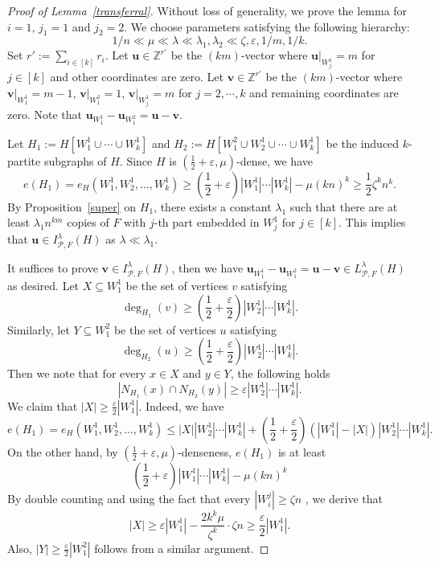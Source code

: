 \documentclass[11pt,a4paper]{article}
\theoremstyle{definition}
\begin{document}
\begin{proof}[Proof of Lemma~\ref{transferral}]
    Without loss of generality, we prove the lemma for $i=1$, $j_1=1$ and $j_2=2$. We choose parameters satisfying the following hierarchy:
    $$1/n\ll \mu \ll \lambda \ll \lambda_1,\lambda_2 \ll \zeta ,\varepsilon, 1/m, 1/k.$$
    Set $r':=\sum _{i\in [k]}r_i$. Let $\mathbf{u}\in \mathbb{Z}^{r'}$ be the $(km)$-vector where $\mathbf{u}|_{W_j^1}=m$ for $j\in [k]$ and other coordinates are zero. Let $\mathbf{v}\in \mathbb{Z}^{r'}$ be the $(km)$-vector where $\mathbf{v}|_{W_1^1}=m-1$, $\mathbf{v}|_{W_1^2}=1$, $\mathbf{v}|_{W_j^1}=m$ for $j=2,\cdots,k$ and remaining coordinates are zero. Note that $\mathbf{u}_{W_1^{1}} -\mathbf{u}_{W_1^{2}}=\mathbf{u}-\mathbf{v}$.
    
Let $H_1:=H[W_1^1\cup \cdots \cup W_k^1]$ and $H_2:=H[W^2_1\cup W_2^1\cup \cdots \cup W_k^1]$ be the induced $k$-partite subgraphs of $H$. Since $H$ is $(\frac{1}{2}+\varepsilon,\mu)$-dense, we have 
    $$e(H_1)=e_H(W_1^1,W_2^1,\dots ,W_k^1)\geq (\frac{1}{2}+\varepsilon)|W_1^1|\cdots |W_k^1|-\mu (kn)^k\geq \frac{1}{2}\zeta^kn^k.$$
By Proposition~\ref{super} on $H_1$, there exists a constant $\lambda_1$ such that there are at least $\lambda_1n^{km}$ copies of $F$ with $j$-th part embedded in $W_j^1$ for $j\in [k]$. This implies that $\mathbf{u}\in I^{\lambda}_{\mathcal{P},F}(H)$ as $\lambda\ll \lambda_1$.

It suffices to prove $\mathbf{v}\in I^{\lambda}_{\mathcal{P},F}(H)$, then we have $\mathbf{u}_{W_1^{1}} -\mathbf{u}_{W_1^{2}}=\mathbf{u}-\mathbf{v}\in L^{\lambda}_{\mathcal{P},F}(H)$ as desired. Let $X\subseteq W_1^1$ be the set of vertices $v$ satisfying 
$$\deg_{H_1}(v)\ge (\frac{1}{2}+\frac{\varepsilon}{2})|W_2^1|\cdots |W_k^1|.$$
Similarly, let $Y\subseteq W_1^2$ be the set of vertices $u$ satisfying 
$$\deg_{H_2}(u)\ge (\frac{1}{2}+\frac{\varepsilon}{2})|W_2^1|\cdots |W_k^1|.$$ 
Then we note that for every $x\in X$ and $y\in Y$, the following holds
\begin{equation}\label{eq:intersect}
|N_{H_1}(x)\cap N_{H_2}(y)|\ge \varepsilon |W_2^1|\cdots |W_k^1|.   
\end{equation}
We claim that $|X|\ge \frac{\varepsilon}{2}|W_1^1|$. Indeed, we have 
\[
e(H_1)=e_H(W_1^1,W_2^1,\dots ,W_k^1)\le |X||W_2^1|\cdots |W_k^1|+(\frac{1}{2}+\frac{\varepsilon}{2})(|W_1^1|-|X|)|W_2^1|\cdots |W_k^1|.
\]
On the other hand, by $(\frac{1}{2}+\varepsilon,\mu)$-denseness, $e(H_1)$ is at least 
$$(\frac{1}{2}+\varepsilon)|W_1^1|\cdots |W_k^1|-\mu (kn)^k$$
By double counting and using the fact that every $|W_i^j|\ge \zeta n$ , we derive that
\begin{equation}\label{eq:X-size}
|X|\ge \varepsilon|W_1^1|-\frac{2k^k\mu}{\zeta ^k}\cdot \zeta n\ge \frac{\varepsilon}{2}|W_1^1|.    
\end{equation}
Also, $|Y|\ge \frac{\varepsilon}{2}|W_1^2|$ follows from a similar argument.


\end{proof}
\end{document}
